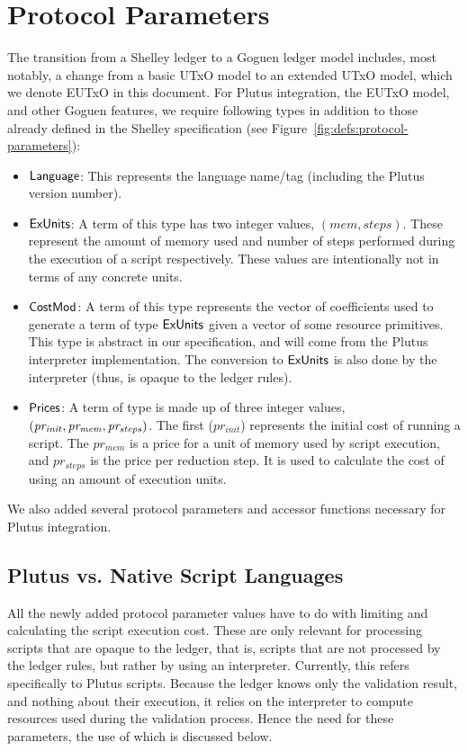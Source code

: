 \section{Protocol Parameters}
\label{sec:protocol-parameters}

The transition from a Shelley ledger to a Goguen ledger model includes, most
notably, a change from a basic UTxO model to an extended UTxO model, which
we denote EUTxO in this document.
For Plutus integration, the EUTxO model, and other Goguen features, we
require following types
in addition to those already defined in the Shelley specification
(see Figure~\ref{fig:defs:protocol-parameters}):

\begin{itemize}
  \item $\mathsf{Language}$: This represents the language name/tag (including the Plutus
  version number).
  \item $\mathsf{ExUnits}$: A term of this type has two integer values,
  $(mem, steps)$. These represent the amount of memory used and number
  of steps performed during the execution of a script
  respectively. These values are intentionally not in terms of any
  concrete units.
  \item $\mathsf{CostMod}$: A term of this type represents the vector of coefficients used to generate
  a term of type $\mathsf{ExUnits}$ given a vector of some resource primitives. This type is
  abstract in our specification, and will come from the Plutus interpreter
  implementation. The
  conversion to $\mathsf{ExUnits}$ is also done by the interpreter (thus, is opaque to the ledger rules).
  \item $\mathsf{Prices}$: A term of type is made up of three integer values,
  $\mathit{(pr_{init}, pr_{mem}, pr_{steps})}$. The first ($pr_{init}$) represents the initial
  cost of running a script. The $pr_{mem}$ is a price for a unit of memory
  used by script execution, and $pr_{steps}$ is the price per
  reduction step. It is used to calculate the cost of using an amount of execution
  units.
\end{itemize}

We also added several protocol parameters and accessor functions necessary for
Plutus integration.

\subsection{Plutus vs. Native Script Languages}
\label{sec:plutus-native}

All the newly added protocol parameter values have to do with limiting and calculating
the script execution cost.
These are only relevant for processing scripts that are opaque
to the ledger, that is, scripts that are not processed by the ledger rules,
but rather by using an interpreter. Currently, this refers specifically
to Plutus scripts. Because the ledger knows only the validation result, and
nothing about their execution, it relies on the interpreter to compute resources
used during the validation process. Hence the need for these parameters,
the use of which is discussed below.

